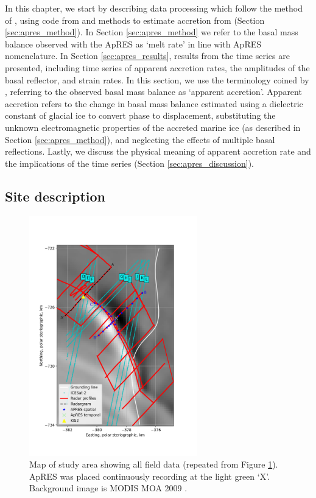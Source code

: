 In this chapter, we start by describing data processing  which follow the method of \cite{nicholls2015ground}, using code from \cite{stewart2018ice} and methods to estimate accretion from \cite{vavnkova2021nature} (Section \ref{sec:apres_method}). In Section \ref{sec:apres_method} we refer to the basal mass balance observed with the ApRES as `melt rate' in line with ApRES nomenclature. In Section \ref{sec:apres_results}, results from the time series are presented, including time series of apparent accretion rates, the amplitudes of the basal reflector, and strain rates. In this section, we use the terminology coined by \cite{vavnkova2021nature}, referring to the observed basal mass balance as `apparent accretion'. Apparent accretion refers to the change in basal mass balance estimated using a dielectric constant of glacial ice to convert phase to displacement, substituting the unknown electromagnetic properties of the accreted marine ice (as described in Section \ref{sec:apres_method}), and neglecting the effects of multiple basal reflections.
 Lastly, we discuss the physical meaning of apparent accretion rate and the implications of the time series (Section \ref{sec:apres_discussion}).

\newpage

\subsection{Site description}

\begin{figure}[!ht]
\centering
\includegraphics[width=0.65\textwidth]{chapters/2/geophysics_overview.png}
\caption[Map of field data]{Map of study area showing all field data (repeated from Figure \ref{fig:geophysics_overview_apres}). ApRES was placed continuously recording at the light green `X'.
Background image is MODIS MOA 2009 \citep{haran2014modis}. 
}
\label{fig:geophysics_overview_apres}
\end{figure}


